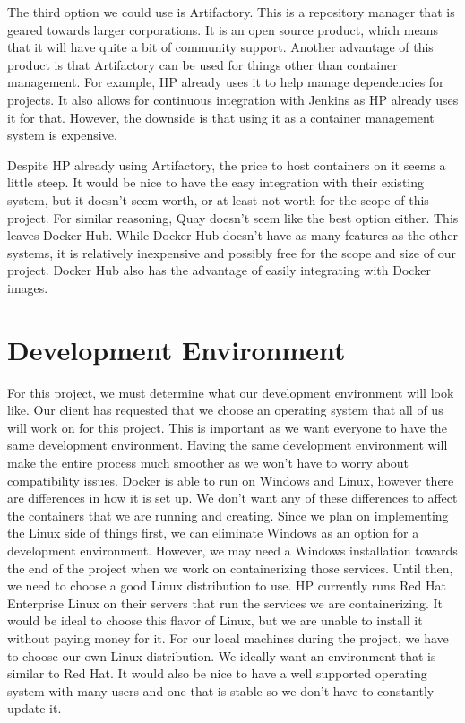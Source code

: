 \documentclass[onecolumn, draftclsnofoot,10pt, compsoc]{IEEEtran}
\begin{document}
The third option we could use is Artifactory. This is a repository manager that is geared towards larger corporations. It is an open source product, which means that it will have quite a bit of community support. Another advantage of this product is that Artifactory can be used for things other than container management. For example, HP already uses it to help manage dependencies for projects. It also allows for continuous integration with Jenkins as HP already uses it for that. However, the downside is that using it as a container management system is expensive. \cite{docker_hosting}

\par

Despite HP already using Artifactory, the price to host containers on it seems a little steep. It would be nice to have the easy integration with their existing system, but it doesn't seem worth, or at least not worth for the scope of this project. For similar reasoning, Quay doesn't seem like the best option either. This leaves Docker Hub. While Docker Hub doesn't have as many features as the other systems, it is relatively inexpensive and possibly free for the scope and size of our project. Docker Hub also has the advantage of easily integrating with Docker images.


\section{Development Environment}
For this project, we must determine what our development environment will look like. Our client has requested that we choose an operating system that all of us will work on for this project. This is important as we want everyone to have the same development environment. Having the same development environment will make the entire process much smoother as we won’t have to worry about compatibility issues. Docker is able to run on Windows and Linux, however there are differences in how it is set up. We don’t want any of these differences to affect the containers that we are running and creating. Since we plan on implementing the Linux side of things first, we can eliminate Windows as an option for a development environment. However, we may need a Windows installation towards the end of the project when we work on containerizing those services. Until then, we need to choose a good Linux distribution to use. HP currently runs Red Hat Enterprise Linux on their servers that run the services we are containerizing. It would be ideal to choose this flavor of Linux, but we are unable to install it without paying money for it. For our local machines during the project, we have to choose our own Linux distribution. We ideally want an environment that is similar to Red Hat. It would also be nice to have a well supported operating system with many users and one that is stable so we don't have to constantly update it.
\end{document}
